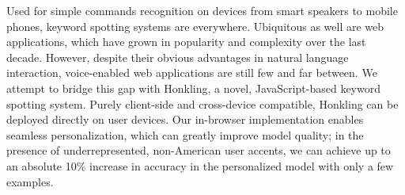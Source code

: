 Used for simple commands recognition on devices from smart speakers to mobile phones,
keyword spotting systems are everywhere. Ubiquitous as well are web applications, which
have grown in popularity and complexity over the last decade.
However, despite their obvious advantages in natural language interaction, voice-enabled
web applications are still few and far between.
We attempt to bridge this gap with Honkling, a novel, JavaScript-based keyword spotting system.
Purely client-side and cross-device compatible, Honkling can be deployed directly on user devices.
Our in-browser implementation enables seamless personalization, which can greatly improve model quality;
in the presence of underrepresented, non-American user accents, we can achieve up to an absolute 10\% increase in accuracy in the personalized model with only a few examples.